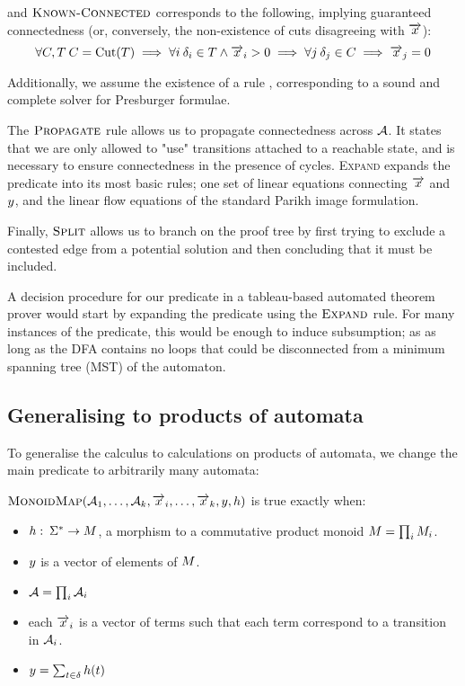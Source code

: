 \documentclass[runningheads]{llncs}
\begin{document}
and $\textsc{Known-Connected}$ corresponds to the following, implying guaranteed
connectedness (or, conversely, the non-existence of cuts disagreeing with $\overrightarrow{x}$):
$$
\forall{C, T}\: C = \operatorname{Cut}(T) \implies \forall{i} \: \delta_i \in T \land \overrightarrow{x}_i > 0 \implies \forall{j} \: \delta_j \in C \implies \overrightarrow{x}_j = 0
$$

Additionally, we assume the existence of a rule \PresburgerClose{},
corresponding to a sound and complete solver for Presburger formulae.

The $\textsc{Propagate}{}$ rule allows us to propagate connectedness across
$\mathcal{A}$. It states that we are only allowed to "use" transitions attached
to a reachable state, and is necessary to ensure connectedness in the presence
of cycles. \textsc{Expand} expands the predicate into its most basic rules; one
set of linear equations connecting $\overrightarrow{x}$ and $y$,
and the linear flow equations of the standard Parikh image formulation.

Finally, $\textsc{Split}{}$ allows us to branch on the proof tree by first trying to
exclude a contested edge from a potential solution and then concluding that it
must be included.

A decision procedure for our predicate in a tableau-based automated theorem
prover would start by expanding the predicate using the $\textsc{Expand}{}$ rule. For
many instances of the predicate, this would be enough to induce subsumption; as
as long as the DFA contains no loops that could be disconnected from a minimum
spanning tree (MST) of the automaton.

\subsection{Generalising to products of automata}

To generalise the calculus to calculations on products of automata, we change the main predicate to arbitrarily many automata:
\begin{definition}
  $\operatorname{\textsc{MonoidMap}}(\mathcal{A}_1, \ldots, \mathcal{A}_k, \overrightarrow{x}_i, \ldots, \overrightarrow{x}_k, y, h)$ is true exactly when:
  \begin{itemize}
  \item $h:\: \Sigma^* \rightarrow M$, a morphism to a commutative product monoid $M = \prod_{i} M_i$.
  \item $y$ is a vector of elements of $M$.
  \item $\mathcal{A} = \prod_{i} \mathcal{A}_i$
  \item each $\overrightarrow{x}_i$ is a vector of terms such that each term correspond to a
    transition in $\mathcal{A}_i$.
  \item $y = \sum_{t \in \delta} h(t)$
  \end{itemize}
  \end{definition}
\end{document}
